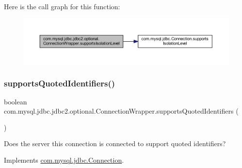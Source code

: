 Here is the call graph for this function\+:
\nopagebreak
\begin{figure}[H]
\begin{center}
\leavevmode
\includegraphics[width=350pt]{classcom_1_1mysql_1_1jdbc_1_1jdbc2_1_1optional_1_1_connection_wrapper_a836c27d27eac131a9226e44e4e57672f_cgraph}
\end{center}
\end{figure}
\mbox{\label{classcom_1_1mysql_1_1jdbc_1_1jdbc2_1_1optional_1_1_connection_wrapper_aee329f3049dfe677c6baa7454004bd2a}} 
\subsubsection{\texorpdfstring{supports\+Quoted\+Identifiers()}{supportsQuotedIdentifiers()}}
{\footnotesize\ttfamily boolean com.\+mysql.\+jdbc.\+jdbc2.\+optional.\+Connection\+Wrapper.\+supports\+Quoted\+Identifiers (\begin{DoxyParamCaption}{ }\end{DoxyParamCaption})}

Does the server this connection is connected to support quoted identifiers? 

Implements \mbox{\hyperlink{interfacecom_1_1mysql_1_1jdbc_1_1_connection_a16e68907781a09083ff1afda25dff502}{com.\+mysql.\+jdbc.\+Connection}}.

